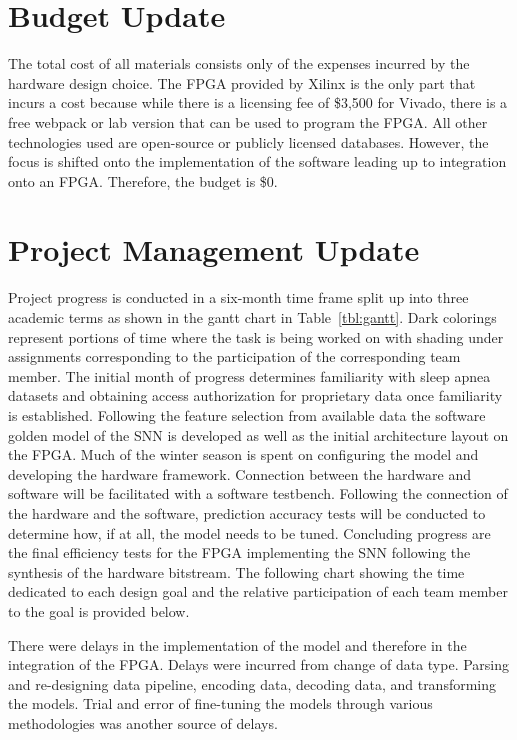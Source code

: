 \documentclass[12pt,titlepage]{article}
\begin{document}
\section{Budget Update}
The total cost of all materials consists only of the expenses incurred by the hardware design choice. The FPGA provided by Xilinx is the only part that incurs a cost because while there is a licensing fee of \$3,500 for Vivado, there is a free webpack or lab version that can be used to program the FPGA. All other technologies used are open-source or publicly licensed databases. However, the focus is shifted onto the implementation of the software leading up to integration onto an FPGA. Therefore, the budget is \$0.

\section{Project Management Update}
Project progress is conducted in a six-month time frame split up into three academic terms as shown in the gantt chart in Table~\ref{tbl:gantt}.
Dark colorings represent portions of time where the task is being worked on with shading under assignments corresponding to the participation of
the corresponding team member. The initial month of progress determines familiarity with sleep
apnea datasets and obtaining access authorization for proprietary data once familiarity is established. Following the feature selection from available data
the software golden model of the SNN is developed as well as the initial architecture layout on the FPGA. Much of the winter season is spent on configuring
the model and developing the hardware framework. Connection between the hardware and software will be facilitated with a software testbench. Following the
connection of the hardware and the software, prediction accuracy tests will be conducted to determine how, if at all, the model needs to be tuned. Concluding
progress are the final efficiency tests for the FPGA implementing the SNN following the synthesis of the hardware bitstream. The following chart showing the
time dedicated to each design goal and the relative participation of each team member to the goal is provided below.

There were delays in the implementation of the model and therefore in the integration of the FPGA. Delays were incurred from change of data type. Parsing and re-designing data pipeline, encoding data, decoding data, and transforming the models. Trial and error of fine-tuning the models through various methodologies was another source of delays.
\end{document}
